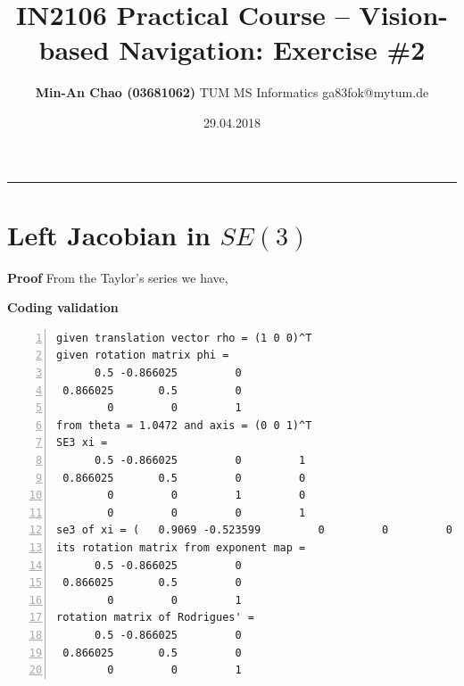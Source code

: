 \documentclass[12pt,a4paper]{article}
\makeatletter
\newcommand{\docTitle}{IN2106 Practical Course -- Vision-based Navigation: Exercise \#2}
\newcommand{\docAuthor}{Min-An Chao (03681062)}
\newcommand{\docAuthorDept}{TUM MS Informatics}
\newcommand{\docAuthorEmail}{ga83fok@mytum.de}
\newcommand{\docDate}{29.04.2018}
\makeatother
\begin{document}
    \title{\vspace{-1.75cm} \large \textsf{\textbf{\docTitle}}}
    \author{\normalsize \textsf{
        \textbf{\docAuthor} \hspace{6pt}\textbar\hspace{6pt}
        \docAuthorDept \hspace{6pt}\textbar\hspace{6pt}
        \docAuthorEmail}}
    \date{\small \textsf{\docDate}}
    \maketitle 
    \thispagestyle{fancy}
    \vspace{-0.5cm}
    \hrule

    \section{Left Jacobian in $SE(3)$}
   
    \textsf{\textbf{Proof}}
    From the Taylor's series we have,

    \textsf{\textbf{Coding validation}}
    \begin{lstlisting}[frame=single,numbers=left]
given translation vector rho = (1 0 0)^T
given rotation matrix phi = 
      0.5 -0.866025         0
 0.866025       0.5         0
        0         0         1
from theta = 1.0472 and axis = (0 0 1)^T
SE3 xi = 
      0.5 -0.866025         0         1
 0.866025       0.5         0         0
        0         0         1         0
        0         0         0         1
se3 of xi = (   0.9069 -0.523599         0         0         0    1.0472)^T
its rotation matrix from exponent map = 
      0.5 -0.866025         0
 0.866025       0.5         0
        0         0         1
rotation matrix of Rodrigues' =
      0.5 -0.866025         0
 0.866025       0.5         0
        0         0         1
    \end{lstlisting}
\end{document}
